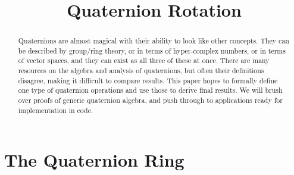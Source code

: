 \documentclass{amsart}
\theoremstyle{definition}
\theoremstyle{remark}
\numberwithin{equation}{section}
\begin{document}
\title{Quaternion Rotation}

\begin{abstract}
  Quaternions are almost magical with their ability to look like other concepts. They can be described by group/ring theory, or in terms of hyper-complex numbers, or in terms of vector spaces, and they can exist as all three of these at once. There are many resources on the algebra and analysis of quaternions, but often their definitions disagree, making it difficult to compare results. This paper hopes to formally define one type of quaternion operations and use those to derive final results. We will brush over proofs of generic quaternion algebra, and push through to applications ready for implementation in code.
\end{abstract}

\maketitle

\section{The Quaternion Ring}
\end{document}

